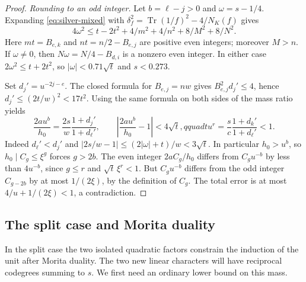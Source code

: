 \documentclass[11pt,reqno]{amsart}
\theoremstyle{remark}\newtheorem{remark}[theorem]{Remark}
\numberwithin{equation}{section}
\begin{document}
\begin{proof}
\smallskip\noindent\emph{Rounding to an odd integer.}
Let $b=\ell-j>0$ and $\omega=s-1/4$. Expanding
\eqref{eq:silver-mixed} with
$\delta_f^2=\operatorname{Tr}(1/f)^2-4/N_K(f)$ gives
\[
 4\omega^2\le t-2t^2+4/m^2+4/n^2+8/M^2+8/N^2 .
\]
Here $mt=B_{e,k}$ and $nt=n/2-B_{e,j}$ are positive even
integers; moreover $M>n$. If $\omega\ne0$, then $N\omega=N/4-B_{d,i}$
is a nonzero even integer. In either case
$2\omega^2\le t+2t^2$, so $|\omega|<0.71\sqrt t$ and $s<0.273$.

Set $d_j'=u^{-2j-e}$. The closed formula for $B_{e,j}=nw$ gives
$B_{e,j}^2 d_j'\le4$, hence $d_j'\le(2t/w)^2<17t^2$.
Using the same formula on both sides of the mass ratio yields
\[
 \frac{2a u^b}{h_0}=\frac{2s}{w}\frac{1+d_j'}{1+d_\ell'},
 \qquad \left|\frac{2a u^b}{h_0}-1\right|<4\sqrt t,qquad
 tu^r=\frac{s}{c}\frac{1+d_k'}{1+d_\ell'}<1 .
\]
Indeed $d_\ell'<d_j'$ and $|2s/w-1|\le(2|\omega|+t)/w<3\sqrt t$.
In particular $h_0>u^b$, so $h_0\mid C_g\le\xi^g$ forces $g>2b$.
The even integer $2aC_g/h_0$ differs from $C_g u^{-b}$ by less
than $4u^{-b}$, since $g\le r$ and $\sqrt t\,\xi^r<1$.
But $C_g u^{-b}$ differs from the odd integer $C_{g-2b}$ by at
most $1/(2\xi)$, by the definition of $C_g$. The total error is
at most $4/u+1/(2\xi)<1$, a contradiction.
\end{proof}

\subsection{The split case and Morita duality}
In the split case the two isolated quadratic factors constrain
the induction of the unit after Morita duality. The two new linear
characters will have reciprocal codegrees summing to $s$. We first
need an ordinary lower bound on this mass.
\end{document}
